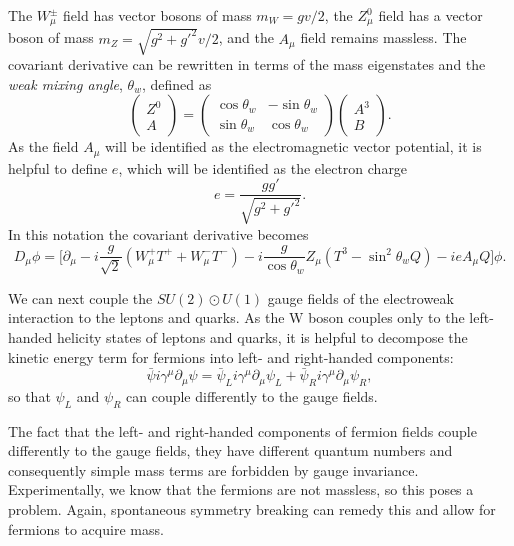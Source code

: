 The $W^\pm_\mu$ field has vector bosons of mass $m_W = gv/2$, the $Z^0_\mu$ field has a vector boson of mass $m_Z = \sqrt{g^2 + g'^2} v/2$, and the $A_\mu$ field remains massless.
The covariant derivative can be rewritten in terms of the mass eigenstates and the \emph{weak mixing angle}, $\theta_w$, defined as
\begin{equation}
    \begin{pmatrix} Z^0 \\ A \end{pmatrix} =
    \begin{pmatrix} \cos \theta_w & -\sin \theta_w \\ \sin \theta_w & \cos \theta_w \end{pmatrix} \begin{pmatrix} A^3 \\ B \end{pmatrix}.
\end{equation}
As the field $A_\mu$ will be identified as the electromagnetic vector potential, it is helpful to define $e$, which will be identified as the electron charge
\begin{equation}
    e = \frac{gg'}{\sqrt{g^2 + g'^2}}.
\end{equation}
In this notation the covariant derivative becomes
\begin{equation}
    D_\mu \phi = \bigg[ \partial_\mu - i \frac{g}{\sqrt{2}} (W^+_\mu T^+ + W_\mu^- T^-) - i \frac{g}{\cos \theta_w} Z_\mu (T^3 - \sin^2 \theta_w Q) - ieA_\mu Q \bigg] \phi.
\end{equation}

We can next couple the $SU(2) \odot U(1)$ gauge fields of the electroweak interaction to the leptons and quarks.
As the W boson couples only to the left-handed helicity states of leptons and quarks, it is helpful to decompose the kinetic energy term for fermions into left- and right-handed components:
\begin{equation}
    \bar{\psi} i \gamma^\mu \partial_\mu \psi = \bar{\psi}_L i \gamma^\mu \partial_\mu \psi_L + \bar{\psi}_R i \gamma^\mu \partial_\mu \psi_R,
\end{equation}
so that $\psi_L$ and $\psi_R$ can couple differently to the gauge fields.

The fact that the left- and right-handed components of fermion fields couple differently to the gauge fields, they have different quantum numbers and consequently simple mass terms are forbidden by gauge invariance.
Experimentally, we know that the fermions are not massless, so this poses a problem.
Again, spontaneous symmetry breaking can remedy this and allow for fermions to acquire mass.

